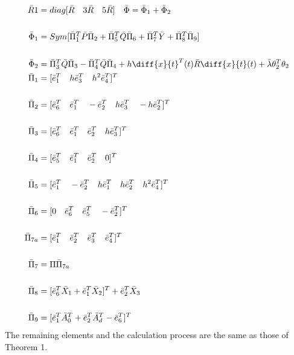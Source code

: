 \documentclass[journal]{IEEEtran}
\begin{document}
\begin{align}
\bar{R}1 &= diag[\bar{R} \quad 3\bar{R} \quad 5\bar{R}] \quad \bar{\Phi} = \bar{\Phi}_1+ \bar{\Phi}_2 \\ \\
\bar{\Phi}_1& = Sym[\bar{\Pi}^{T}_{1}\bar{P}\bar{\Pi}_2 + \bar{\Pi}^{T}_{5}\bar{Q}\bar{\Pi}_{6} + \bar{\Pi}^{T}_{7}\bar{Y} + \bar{\Pi}^{T}_{8}\bar{\Pi}_{9}] \\ \\
\bar{\Phi}_{2}& = \bar{\Pi}^{T}_{3}\bar{Q}\bar{\Pi}_{3} - \bar{\Pi}^{T}_{4}\bar{Q}\bar{\Pi}_{4} + h\diff{x}{t}^T(t)\bar{R}\diff{x}{t}(t) + \bar{\lambda}\theta^{T}_{2}\theta_2 \\ 
\bar{\Pi}_{1} &= [\bar{e}^{T}_{1} \quad h\bar{e}^{T}_{3} \quad h^2\bar{e}^{T}_{4}]^T \\ \\ 
\bar{\Pi}_{2} &= [\bar{e}^{T}_{6} \quad \bar{e}^{T}_{1} \quad -\bar{e}^{T}_{2} \quad h\bar{e}^{T}_{3} \quad -h\bar{e}^{T}_{2} ]^T \\ \\
\bar{\Pi}_{3} &= [\bar{e}^{T}_{6} \quad \bar{e}^{T}_{1} \quad \bar{e}^{T}_{2} \quad h\bar{e}^{T}_{3}]^T \\ \\ 
\bar{\Pi}_{4} &= [\bar{e}^{T}_{5} \quad \bar{e}^{T}_{1} \quad \bar{e}^{T}_{2} \quad 0]^T \\ \\
\bar{\Pi}_{5} &= [\bar{e}^{T}_{1} \quad -\bar{e}^{T}_{2} \quad h\bar{e}^{T}_{1} \quad h\bar{e}^{T}_{2} \quad h^2\bar{e}^{T}_{4}]^T \\ \\
\bar{\Pi}_{6} &= [0 \quad \bar{e}^{T}_{6} \quad \bar{e}^{T}_{5} \quad -\bar{e}^{T}_{2}]^T \\ \\ 
\bar{\Pi}_{7a} &= [\bar{e}^{T}_{1} \quad \bar{e}^{T}_{2} \quad \bar{e}^{T}_{3} \quad \bar{e}^{T}_{4}]^T \\ \\ 
\bar{\Pi}_{7} &= \Pi\bar{\Pi}_{7a} \\ \\
\bar{\Pi}_{8} &= [\bar{e}^{T}_{6}\bar{X}_{1} + \bar{e}^{T}_{1}\bar{X}_{2}]^T + \bar{e}^{T}_{2}\bar{X}_{3} \\ \\
\bar{\Pi}_{9} &= [\bar{e}^{T}_{1}\bar{A}^{T}_{0} + \bar{e}^{T}_{2}\bar{A}^{T}_{d}  -\bar{e}^{T}_{6}]^T 
\end{align}
The remaining elements and the calculation process are the same as those of Theorem 1.
\end{document}
